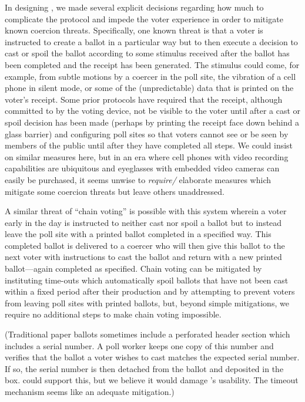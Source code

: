 \label{sec:coercion}

In designing \projname, we made several explicit decisions regarding how much to complicate the protocol and impede the voter experience in order to mitigate known coercion threats.  Specifically, one known threat is that a voter is instructed to create a ballot in a particular way but to then execute a decision to cast or spoil the ballot according to some stimulus received after the ballot has been completed and the receipt has been generated.  The stimulus could come, for example, from subtle motions by a coercer in the poll site, the vibration of a cell phone in silent mode, or some of the (unpredictable) data that is printed on the voter’s receipt.  Some prior protocols have required that the receipt, although committed to by the voting device, not be visible to the voter until after a cast or spoil decision has been made (perhaps by printing the receipt face down behind a glass barrier) and configuring poll sites so that voters cannot see or be seen by members of the public until after they have completed all steps.  We could insist on similar measures here, but in an era where cell phones with video recording capabilities are ubiquitous and eyeglasses with embedded video cameras can easily be purchased, it seems unwise to {\em require/} elaborate measures which mitigate some coercion threats but leave others unaddressed.

A similar threat of ``chain voting'' is possible with this system wherein a voter early in the day is instructed to neither cast nor spoil a ballot but to instead leave the poll site with a printed ballot completed in a specified way.  This completed ballot is delivered to a coercer who will then give this ballot to the next voter with instructions to cast the ballot and return with a new printed ballot---again completed as specified.  Chain voting can be mitigated by instituting time-outs which automatically spoil ballots that have not been cast within a fixed period after their production and by attempting to prevent voters from leaving poll sites with printed ballots, but, beyond simple mitigations, we require no additional steps to make chain voting impossible. 

(Traditional paper ballots sometimes include a perforated header section which includes a serial number. A poll worker keeps one copy of this number and verifies that the ballot a voter wishes to cast matches the expected serial number. If so, the serial number is then detached from the ballot and deposited in the box. \projname could support this, but we believe it would damage \projname's usability. The timeout mechanism seems like an adequate mitigation.)

